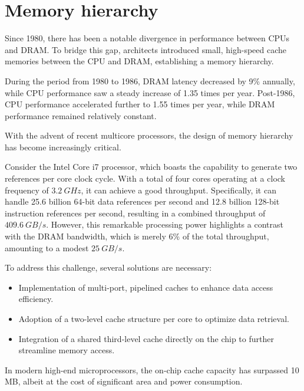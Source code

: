 \section{Memory hierarchy}

Since 1980, there has been a notable divergence in performance between CPUs and DRAM.
To bridge this gap, architects introduced small, high-speed cache memories between the CPU and DRAM, establishing a memory hierarchy.

During the period from 1980 to 1986, DRAM latency decreased by 9\% annually, while CPU performance saw a steady increase of 1.35 times per year.
Post-1986, CPU performance accelerated further to 1.55 times per year, while DRAM performance remained relatively constant.

With the advent of recent multicore processors, the design of memory hierarchy has become increasingly critical.
\begin{example}
    Consider the Intel Core i7 processor, which boasts the capability to generate two references per core clock cycle. 
    With a total of four cores operating at a clock frequency of $3.2\:GHz$, it can achieve a good throughput.
    Specifically, it can handle 25.6 billion 64-bit data references per second and 12.8 billion 128-bit instruction references per second, resulting in a combined throughput of $409.6\:GB/s$.
    However, this remarkable processing power highlights a contrast with the DRAM bandwidth, which is merely 6\% of the total throughput, amounting to a modest $25\:GB/s$.
\end{example}
To address this challenge, several solutions are necessary:
\begin{itemize}
    \item Implementation of multi-port, pipelined caches to enhance data access efficiency.
    \item Adoption of a two-level cache structure per core to optimize data retrieval.
    \item Integration of a shared third-level cache directly on the chip to further streamline memory access.
\end{itemize}
In modern high-end microprocessors, the on-chip cache capacity has surpassed 10 MB, albeit at the cost of significant area and power consumption.

